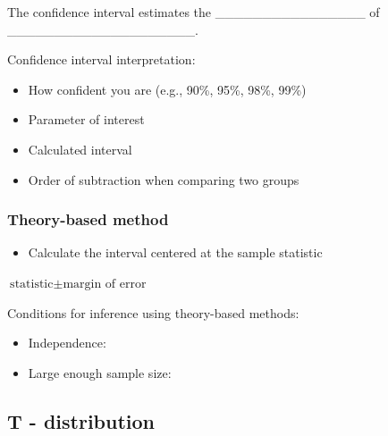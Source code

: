 \documentclass[
]{report}
\providecommand{\tightlist}{%
  \setlength{\itemsep}{0pt}\setlength{\parskip}{0pt}}
\newcommand{\rgi}{\hspace{24pt}}  %
\begin{document}
The confidence interval estimates the \_\_\_\_\_\_\_\_\_\_\_\_\_\_\_\_
of \_\_\_\_\_\_\_\_\_\_\_\_\_\_\_\_\_\_\_\_.

Confidence interval interpretation:

\begin{itemize}
\item
  How confident you are (e.g., 90\%, 95\%, 98\%, 99\%)
\item
  Parameter of interest
\item
  Calculated interval
\item
  Order of subtraction when comparing two groups
\end{itemize}

\vspace{0.8in}

\newpage

\subsubsection*{Theory-based method}\label{theory-based-method-1}

\begin{itemize}
\tightlist
\item
  Calculate the interval centered at the sample statistic
\end{itemize}

\rgi \(\text{statistic} \pm \text{margin of error}\)

\vspace{0.5in}

Conditions for inference using theory-based methods:

\begin{itemize}
\tightlist
\item
  Independence:
\end{itemize}

\vspace{0.2in}

\begin{itemize}
\tightlist
\item
  Large enough sample size:
\end{itemize}

\vspace{0.2in}

\subsection*{T - distribution}\label{t---distribution-1}
\end{document}
